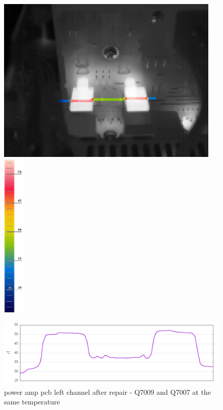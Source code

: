 \documentclass[a4paper,twoside,notitlepage]{article}
\begin{document}
\begin{figure}[hptb!]
 \centering
 \includegraphics[height=8cm, keepaspectratio=true]{img_report/IR_6361_hl}
 \includegraphics[height=8cm, keepaspectratio=true]{img_report/IR_6361_scale}

 \vspace*{5mm}
 \includegraphics[width=12cm, keepaspectratio=true]{img_report/IR_6361_hl_gnuplot}

 \caption{power amp pcb left channel after repair - Q7009 and Q7007 at the same temperature}
\end{figure}
\end{document}
